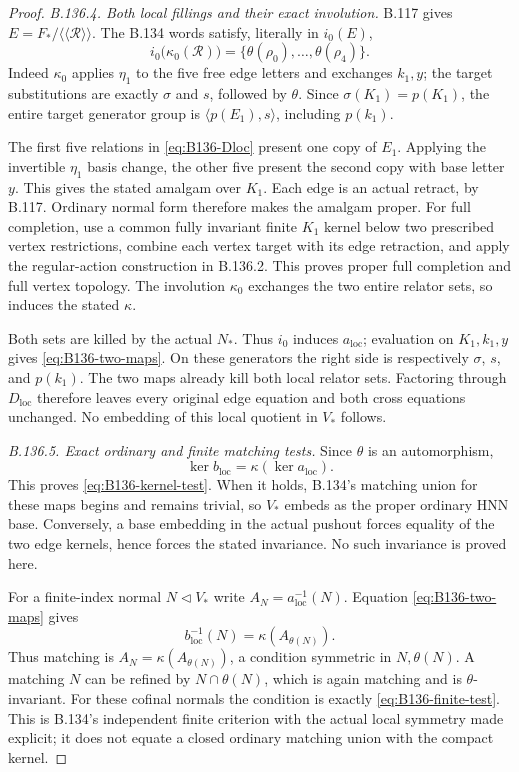 \begin{proof}
\emph{B.136.4. Both local fillings and their exact involution.}
B.117 gives $E=F_*/\langle\!\langle\mathcal R\rangle\!\rangle$.
The B.134 words satisfy, literally in $i_0(E)$,
\[
 i_0\bigl(\kappa_0(\mathcal R)\bigr)
       =\{\theta(\rho_0),\ldots,\theta(\rho_4)\}.
\]
Indeed $\kappa_0$ applies $\eta_1$ to the five free edge
letters and exchanges $k_1,y$; the target substitutions are
exactly $\sigma$ and $s$, followed by $\theta$.
Since $\sigma(K_1)=p(K_1)$, the entire target generator group
is $\langle p(E_1),s\rangle$, including $p(k_1)$.

The first five relations in \eqref{eq:B136-Dloc} present one
copy of $E_1$. Applying the invertible $\eta_1$ basis change,
the other five present the second copy with base letter $y$.
This gives the stated amalgam over $K_1$. Each edge is an
actual retract, by B.117. Ordinary normal form therefore makes
the amalgam proper. For full completion, use a common fully
invariant finite $K_1$ kernel below two prescribed vertex
restrictions, combine each vertex target with its edge
retraction, and apply the regular-action construction in
B.136.2. This proves proper full completion and full vertex
topology. The involution $\kappa_0$ exchanges the two entire
relator sets, so induces the stated $\kappa$.

Both sets are killed by the actual $N_*$. Thus $i_0$ induces
$a_{\mathrm{loc}}$; evaluation on $K_1,k_1,y$ gives
\eqref{eq:B136-two-maps}. On these generators the right side
is respectively $\sigma$, $s$, and $p(k_1)$.
The two maps already kill both local relator sets. Factoring
through $D_{\mathrm{loc}}$ therefore leaves every original
edge equation and both cross equations unchanged. No
embedding of this local quotient in $V_*$ follows.

\emph{B.136.5. Exact ordinary and finite matching tests.}
Since $\theta$ is an automorphism,
\[
 \ker b_{\mathrm{loc}}=\kappa(\ker a_{\mathrm{loc}}).
\]
This proves \eqref{eq:B136-kernel-test}. When it holds, B.134's
matching union for these maps begins and remains trivial,
so $V_*$ embeds as the proper ordinary HNN base. Conversely,
a base embedding in the actual pushout forces equality of
the two edge kernels, hence forces the stated invariance.
No such invariance is proved here.

For a finite-index normal $N\triangleleft V_*$ write
$A_N=a_{\mathrm{loc}}^{-1}(N)$. Equation
\eqref{eq:B136-two-maps} gives
\[
 b_{\mathrm{loc}}^{-1}(N)=\kappa(A_{\theta(N)}).
\]
Thus matching is $A_N=\kappa(A_{\theta(N)})$, a condition
symmetric in $N,\theta(N)$. A matching $N$ can be refined by
$N\cap\theta(N)$, which is again matching and is
$\theta$-invariant. For these cofinal normals the condition
is exactly \eqref{eq:B136-finite-test}. This is B.134's
independent finite criterion with the actual local symmetry
made explicit; it does not equate a closed ordinary matching
union with the compact kernel.


\end{proof}
